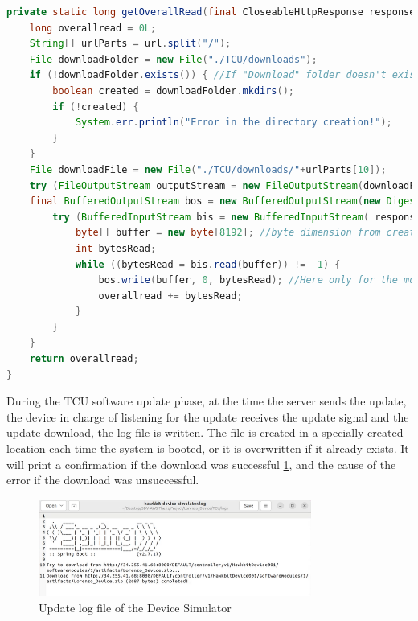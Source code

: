 \begin{lstlisting}[language=Java, caption={Downloading files from the OTA server to the specific device simulator folder}, label=lst:OverallReadHDS]
private static long getOverallRead(final CloseableHttpResponse response, final MessageDigest md, final String url) throws IOException {
    long overallread = 0L;
    String[] urlParts = url.split("/");
    File downloadFolder = new File("./TCU/downloads");
    if (!downloadFolder.exists()) { //If "Download" folder doesn't exist
        boolean created = downloadFolder.mkdirs();
        if (!created) {
            System.err.println("Error in the directory creation!");
        }
    }
    File downloadFile = new File("./TCU/downloads/"+urlParts[10]);
    try (FileOutputStream outputStream = new FileOutputStream(downloadFile);
    final BufferedOutputStream bos = new BufferedOutputStream(new DigestOutputStream(outputStream, md))) {
        try (BufferedInputStream bis = new BufferedInputStream( response.getEntity().getContent())) {
            byte[] buffer = new byte[8192]; //byte dimension from createBuffer of ByteStream.class
            int bytesRead;
            while ((bytesRead = bis.read(buffer)) != -1) {
                bos.write(buffer, 0, bytesRead); //Here only for the md hash correctness.
                overallread += bytesRead;
            }
        }
    }
    return overallread;
}
\end{lstlisting}

During the TCU software update phase, at the time the server sends the update, the device in charge of listening for the update receives the update signal and the update download, the log file is written. The file is created in a specially created location each time the system is booted, or it is overwritten if it already exists. It will print a confirmation if the download was successful \ref{fig:update_log_HDS}, and the cause of the error if the download was unsuccessful.

\begin{figure}[h]  %
    \centering
    \includegraphics[width=0.8\textwidth]{images/update_log_HDS.png}  %
    \caption{Update log file of the Device Simulator}
    \label{fig:update_log_HDS}
\end{figure} 

